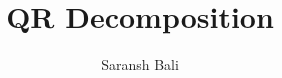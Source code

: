 \documentclass[journal,12pt,twocolumn]{IEEEtran}
\begin{document}
\makeatletter
{}
\makeatother
\let\StandardTheFigure\thefigure
\let\vec\mathbf
\renewcommand{\thefigure}{\theproblem}
\def\putbox#1#2#3{\makebox[0in][l]{\makebox[#1][l]{}\raisebox{\baselineskip}[0in][0in]{\raisebox{#2}[0in][0in]{#3}}}}
     \def\rightbox#1{\makebox[0in][r]{#1}}
     \def\centbox#1{\makebox[0in]{#1}}
     \def\topbox#1{\raisebox{-\baselineskip}[0in][0in]{#1}}
     \def\midbox#1{\raisebox{-0.5\baselineskip}[0in][0in]{#1}}
\vspace{3cm}
\title{QR Decomposition}
\author{Saransh Bali}
%
%
%
% 
%
\end{document}
